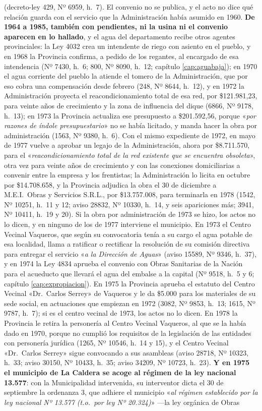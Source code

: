 (decreto-ley 429, Nº 6959, h.\ 7). El convenio no se publica, y el acto no dice qué relación guarda con el servicio que la Administración había asumido en 1960. \textbf{De 1964 a 1985, también con pendientes, ni la usina ni el convenio aparecen en lo hallado}, y el agua del departamento recibe otros agentes provinciales: la Ley 4032 crea un intendente de riego con asiento en el pueblo, y en 1968 la Provincia confirma, a pedido de los regantes, al encargado de esa intendencia (Nº 7430, h.\ 6; 800, Nº 8090, h.\ 12; capítulo \ref{cap:aguabaja}); en 1970 el agua corriente del pueblo la atiende el tomero de la Administración, que por eso cobra una compensación desde febrero (248, Nº 8644, h.\ 12), y en 1972 la Administración proyecta el reacondicionamiento total de esa red, por \$121.981,23, para veinte años de crecimiento y la zona de influencia del dique (6866, Nº 9178, h.\ 13); en 1973 la Provincia actualiza ese presupuesto a \$201.592,56, porque «\textit{por razones de índole presupuestario}» no se había licitado, y manda hacer la obra por administración (1563, Nº 9380, h.\ 6). Con el mismo expediente de 1972, en mayo de 1977 vuelve a aprobar un legajo de la Administración, ahora por \$8.711.570, para el «\textit{reacondicionamiento total de la red existente que se encuentra obsoleta}», otra vez para veinte años de crecimiento y con las conexiones domiciliarias a convenir entre la empresa y los frentistas; la Administración lo licita en octubre por \$14.708.658, y la Provincia adjudica la obra el 30 de diciembre a M.E.I.\ Obras y Servicios S.R.L., por \$13.757.008, para terminarla en 1978 (1542, Nº 10251, h.\ 11 y 12; aviso 28832, Nº 10330, h.\ 14, y seis apariciones más; 3941, Nº 10411, h.\ 19 y 20). Si la obra por administración de 1973 se hizo, los actos no lo dicen, y en ninguno de los de 1977 interviene el municipio. En 1973 el Centro Vecinal Vaqueros, que según su convocatoria tenía a su cargo el agua potable de esa localidad, llama a ratificar o rectificar la resolución de su comisión directiva para entregar el servicio «\textit{a la Dirección de Aguas}» (aviso 15589, Nº 9346, h.\ 37), y en 1974 la Ley 4834 aprueba el convenio con Obras Sanitarias de la Nación para el acueducto que llevará el agua del embalse a la capital (Nº 9518, h.\ 5 y 6; capítulo \ref{cap:expropiacion}). En 1975 la Provincia aprueba el estatuto del Centro Vecinal «Dr.\ Carlos Serrey» de Vaqueros y le da \$5.000 para los materiales de su sede social, en actuaciones que empiezan en 1972 (3082, Nº 9853, h.\ 13; 1615, Nº 9787, h.\ 7); si es el centro vecinal de 1973, los actos no lo dicen. En 1978 la Provincia le retira la personería al Centro Vecinal Vaqueros, al que se la había dado en 1970, porque no cumplió los requisitos de la legislación de las entidades con personería jurídica (1265, Nº 10546, h.\ 14 y 15), y el Centro Vecinal «Dr.\ Carlos Serrey» sigue convocando a sus asambleas (aviso 28718, Nº 10323, h.\ 33; aviso 30150, Nº 10433, h.\ 35; aviso 34209, Nº 10723, h.\ 23). \textbf{Y en 1975 el municipio de La Caldera se acoge al régimen de la ley nacional 13.577}: con la Municipalidad intervenida, su interventor dicta el 30 de septiembre la ordenanza 3, que adhiere el municipio «\textit{al régimen establecido por la ley nacional Nº 13.577 (t.o.\ por ley Nº 20.324)}» ---la ley orgánica de Obras 